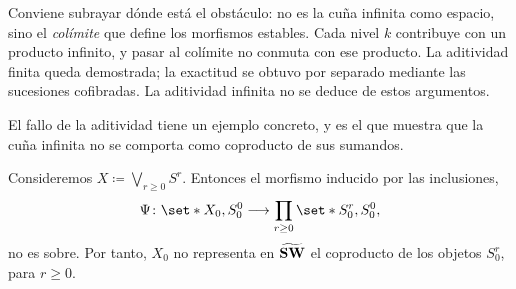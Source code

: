 \begin{nota}
   Conviene subrayar dónde está el obstáculo: no es la cuña infinita como espacio, sino el \emph{colímite} que define los morfismos estables. Cada nivel $k$ contribuye con un producto infinito, y pasar al colímite no conmuta con ese producto. La aditividad finita queda demostrada; la exactitud se obtuvo por separado mediante las sucesiones cofibradas. La aditividad infinita no se deduce de estos argumentos.
\end{nota}

El fallo de la aditividad tiene un ejemplo concreto, y es el que muestra que la cuña infinita no se comporta como coproducto de sus sumandos.

\begin{ejem}\label{ejem:cuna}
Consideremos $X\coloneq\bigvee_{r\ge0} S^r$.
Entonces el morfismo inducido por las inclusiones,
\[
\Psi\colon\set*{X_0,S^0_0}\longrightarrow\prod_{r\ge0}\set*{S^r_0,S^0_0},
\]
no es sobre. Por tanto, $X_0$ no representa en $\widetilde{\mathbf{SW}}$ el coproducto de los objetos $S^r_0$, para $r\geq0$.
\end{ejem}


